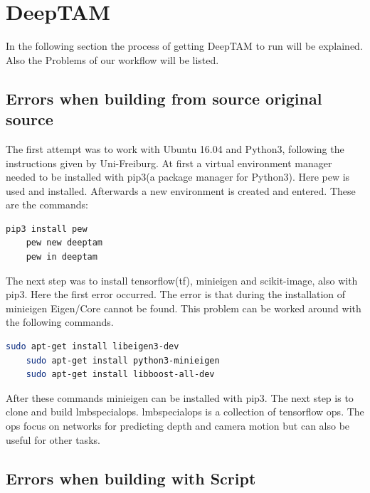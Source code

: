 \section{DeepTAM\authorB}
In the following section the process of getting DeepTAM to run will be explained. Also the Problems of our workflow will be listed.

\subsection{Errors when building from source original source}

The first attempt was to work with Ubuntu 16.04 and Python3, following the instructions given by Uni-Freiburg. At first a virtual environment manager needed to be installed with pip3(a package manager for Python3). Here pew is used and installed. Afterwards a new environment is created and entered. These are the commands:  

\begin{lstlisting}[language=bash]
    pip3 install pew
    pew new deeptam
    pew in deeptam
\end{lstlisting}

The next step was to install tensorflow(\gls{tf}), minieigen and scikit-image, also with pip3. Here the first error occurred. The error is that during the installation of minieigen Eigen/Core cannot be found. This problem can be worked around with the following commands.

\begin{lstlisting}[language=bash]
    sudo apt-get install libeigen3-dev
    sudo apt-get install python3-minieigen 
    sudo apt-get install libboost-all-dev
\end{lstlisting}

After these commands minieigen can be installed with pip3. The next step is to clone and build lmbspecialops. lmbspecialops is a collection of tensorflow ops. The ops focus on networks for predicting depth and camera motion but can also be useful for other tasks. 

\subsection{Errors when building with Script}
